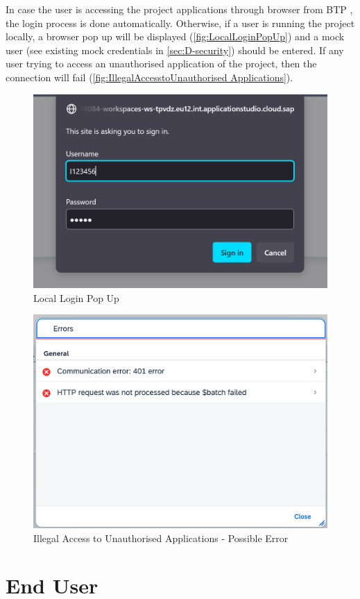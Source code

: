 In case the user is accessing the project applications through browser from BTP \cite{btp}, the login process is done automatically. Otherwise, if a user is running the project locally, a browser pop up will be displayed (\autoref{fig:LocalLoginPopUp}) and a mock user (see existing mock credentials in \autoref{sec:D-security}) should be entered.
If any user trying to access an unauthorised application of the project, then the connection will fail (\autoref{fig:IllegalAccesstoUnauthorised Applications}). 

\begin{figure}[H]
	\centering
	\includegraphics[width=0.6\linewidth]{images/user_doc/overviews/localLogin.png}
	\caption{Local Login Pop Up}
	\label{fig:LocalLoginPopUp}
\end{figure}

\begin{figure}[H]
	\centering
	\includegraphics[width=0.6\linewidth]{images/user_doc/overviews/ConnectionError1.png}
	\caption{Illegal Access to Unauthorised Applications - Possible Error}
	\label{fig:IllegalAccesstoUnauthorised Applications}
\end{figure}

\pagebreak

\section{End User}
\label{sec:UdocEndUser}

